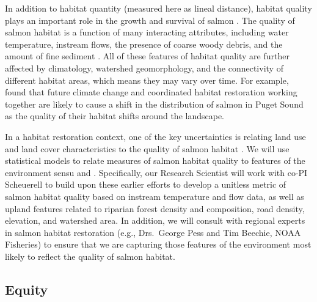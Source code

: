 In addition to habitat quantity (measured here as lineal distance), habitat quality plays an important role in the growth and survival of salmon \citep{Pess_2011}. The quality of salmon habitat is a function of many interacting attributes, including water temperature, instream flows, the presence of coarse woody debris, and the amount of fine sediment \citep{Bartz_2006,Isaak_2007}. All of these features of habitat quality are further affected by climatology, watershed geomorphology, and the connectivity of different habitat areas, which means they may vary over time. For example, \citet{Battin_2007} found that future climate change and coordinated habitat restoration working together are likely to cause a shift in the distribution of salmon in Puget Sound as the quality of their habitat shifts around the landscape.

In a habitat restoration context, one of the key uncertainties is relating land use and land cover characteristics to the quality of salmon habitat \citep{Bartz_2006, Jorgensen_2009}. We will use statistical models to relate measures of salmon habitat quality to features of the environment sensu \citet{Bartz_2006} and \citet{Jorgensen_2009}. Specifically, our Research Scientist will work with co-PI Scheuerell to build upon these earlier efforts to develop a unitless metric of salmon habitat quality based on instream temperature and flow data, as well as upland features related to riparian forest density and composition, road density, elevation, and watershed area. In addition, we will consult with regional experts in salmon habitat restoration (e.g., Drs.\ George Pess and Tim Beechie, NOAA Fisheries) to ensure that we are capturing those features of the environment most likely to reflect the quality of salmon habitat.

\subsection*{Equity}

